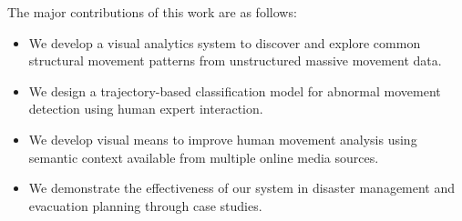 The major contributions of this work are as follows:
\begin{itemize}
\item We develop a visual analytics system to discover and explore common structural movement patterns from unstructured massive movement data.
\item We design a trajectory-based classification model for abnormal movement detection using human expert interaction.
\item We develop visual means to improve human movement analysis using semantic context available from multiple online media sources.
\item We demonstrate the effectiveness of our system in disaster management and evacuation planning through case studies.
\end{itemize}





%



